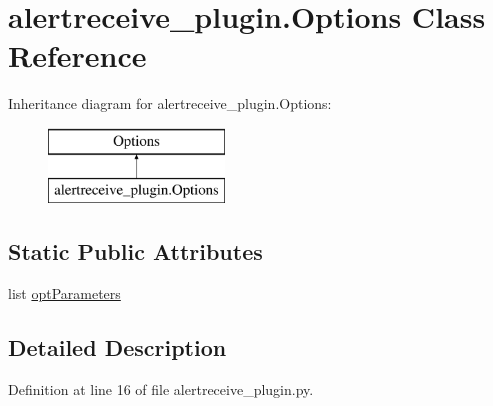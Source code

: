 \hypertarget{classalertreceive__plugin_1_1_options}{\section{alertreceive\-\_\-plugin.\-Options Class Reference}
\label{classalertreceive__plugin_1_1_options}
}
Inheritance diagram for alertreceive\-\_\-plugin.\-Options\-:\begin{figure}[H]
\begin{center}
\leavevmode
\includegraphics[height=2.000000cm]{d7/d41/classalertreceive__plugin_1_1_options}
\end{center}
\end{figure}
\subsection*{Static Public Attributes}
\begin{DoxyCompactItemize}
\item 
list \hyperlink{classalertreceive__plugin_1_1_options_a33de9f8dfdb7c8e7c1963b16b630eea1}{opt\-Parameters}
\end{DoxyCompactItemize}


\subsection{Detailed Description}


Definition at line 16 of file alertreceive\-\_\-plugin.\-py.



